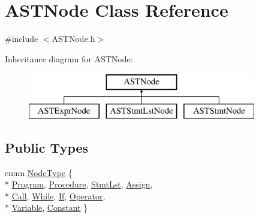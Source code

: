 \hypertarget{class_a_s_t_node}{\section{A\-S\-T\-Node Class Reference}
\label{class_a_s_t_node}
}


{\ttfamily \#include $<$A\-S\-T\-Node.\-h$>$}

Inheritance diagram for A\-S\-T\-Node\-:\begin{figure}[H]
\begin{center}
\leavevmode
\includegraphics[height=2.000000cm]{class_a_s_t_node}
\end{center}
\end{figure}
\subsection*{Public Types}
\begin{DoxyCompactItemize}
\item 
enum \hyperlink{class_a_s_t_node_a4fd016b5f0e44ea6aca3542d27de3859}{Node\-Type} \{ \\*
\hyperlink{class_a_s_t_node_a4fd016b5f0e44ea6aca3542d27de3859a677c3ce5f7357040776de23f9999fb32}{Program}, 
\hyperlink{class_a_s_t_node_a4fd016b5f0e44ea6aca3542d27de3859a96afa6f10aedf44a6e509b83015d8196}{Procedure}, 
\hyperlink{class_a_s_t_node_a4fd016b5f0e44ea6aca3542d27de3859a3268f5ccc42956fa2011adac0700803d}{Stmt\-Lst}, 
\hyperlink{class_a_s_t_node_a4fd016b5f0e44ea6aca3542d27de3859abc11d3cef1a08db1d7489c8a70c73c75}{Assign}, 
\\*
\hyperlink{class_a_s_t_node_a4fd016b5f0e44ea6aca3542d27de3859a20e38466c592b716e5ac11969753de1c}{Call}, 
\hyperlink{class_a_s_t_node_a4fd016b5f0e44ea6aca3542d27de3859a57ddbd1d98e862fd5deaeec85c5483c4}{While}, 
\hyperlink{class_a_s_t_node_a4fd016b5f0e44ea6aca3542d27de3859a2c6c2af563ff11ef2e968214c790593c}{If}, 
\hyperlink{class_a_s_t_node_a4fd016b5f0e44ea6aca3542d27de3859a4ea10d7791557fbcf1057136cf012e16}{Operator}, 
\\*
\hyperlink{class_a_s_t_node_a4fd016b5f0e44ea6aca3542d27de3859ad1626bafffaf48dc7bd22f2f13f5a50a}{Variable}, 
\hyperlink{class_a_s_t_node_a4fd016b5f0e44ea6aca3542d27de3859a114b1c32de0827e6ee5ff81613b5bb19}{Constant}
 \}
\end{DoxyCompactItemize}
